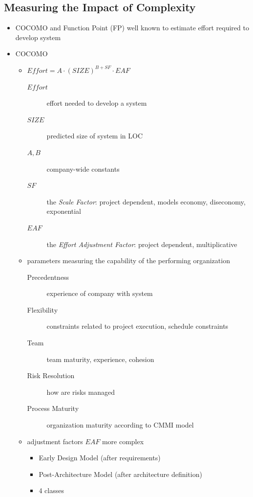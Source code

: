\documentclass[a4paper, 10pt]{article}
\begin{document}
\subsection*{Measuring the Impact of Complexity}
\begin{itemize}
    \item COCOMO and Function Point (FP) well known to estimate effort required to develop system
    \item COCOMO
    \begin{itemize}
        \item $Effort=A\cdot (SIZE)^{B+SF}\cdot EAF$
        \begin{description}
            \item[$Effort$] effort needed to develop a system
            \item[$SIZE$] predicted size of system in LOC
            \item[$A, B$] company-wide constants
            \item[$SF$] the \emph{Scale Factor}: project dependent, models economy, diseconomy, exponential
            \item[$EAF$] the \emph{Effort Adjustment Factor}: project dependent, multiplicative
        \end{description}
        \item parameters measuring the capability of the performing organization
        \begin{description}
            \item[Precedentness] experience of company with system
            \item[Flexibility] constraints related to project execution, schedule constraints
            \item[Team] team maturity, experience, cohesion
            \item[Risk Resolution] how are risks managed
            \item[Process Maturity] organization maturity according to CMMI model
        \end{description}
        \item adjustment factors $EAF$ more complex
        \begin{itemize}
            \item Early Design Model (after requirements)
            \item Post-Architecture Model (after architecture definition)
            \item 4 classes
            \begin{description}

\end{description}
\end{itemize}
\end{itemize}
\end{itemize}
\end{document}
